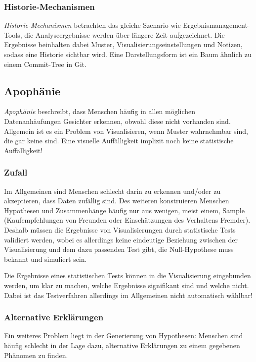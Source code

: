 			\subsubsection{Historie-Mechanismen}
				\emph{Historie-Mechanismen} betrachten das gleiche Szenario wie Ergebnismanagement-Tools, \dh die Analyseergebnisse werden über längere Zeit aufgezeichnet. Die Ergebnisse beinhalten dabei Muster, Visualisierungseinstellungen und Notizen, sodass eine Historie sichtbar wird. Eine Darstellungsform ist \zB ein Baum ähnlich zu einem Commit-Tree in Git.

		\subsection{Apophänie}
			\emph{Apophänie} beschreibt, dass Menschen häufig in allen möglichen Datenanhäufungen Gesichter erkennen, obwohl diese nicht vorhanden sind. Allgemein ist es ein Problem von Visualisieren, wenn Muster wahrnehmbar sind, die gar keine sind. Eine visuelle Auffälligkeit implizit noch keine statistische Auffälligkeit!

			\subsubsection{Zufall}
				Im Allgemeinen sind Menschen schlecht darin zu erkennen und/oder zu akzeptieren, dass Daten zufällig sind. Des weiteren konstruieren Menschen Hypothesen und Zusammenhänge häufig nur aus wenigen, meist einem, Sample (\zB Kaufempfehlungen von Freunden oder Einschätzungen des Verhaltens Fremder). Deshalb müssen die Ergebnisse von Visualisierungen durch statistische Tests validiert werden, wobei es allerdings keine eindeutige Beziehung zwischen der Visualisierung und dem dazu passenden Test gibt, \dh die Null-Hypothese muss bekannt und simuliert sein.

				Die Ergebnisse eines statistischen Tests können in die Visualisierung eingebunden werden, um klar zu machen, welche Ergebnisse signifikant sind und welche nicht. Dabei ist das Testverfahren allerdings im Allgemeinen nicht automatisch wählbar!

			\subsubsection{Alternative Erklärungen}
				Ein weiteres Problem liegt in der Generierung von Hypothesen: Menschen sind häufig schlecht in der Lage dazu, alternative Erklärungen zu einem gegebenen Phänomen zu finden.

